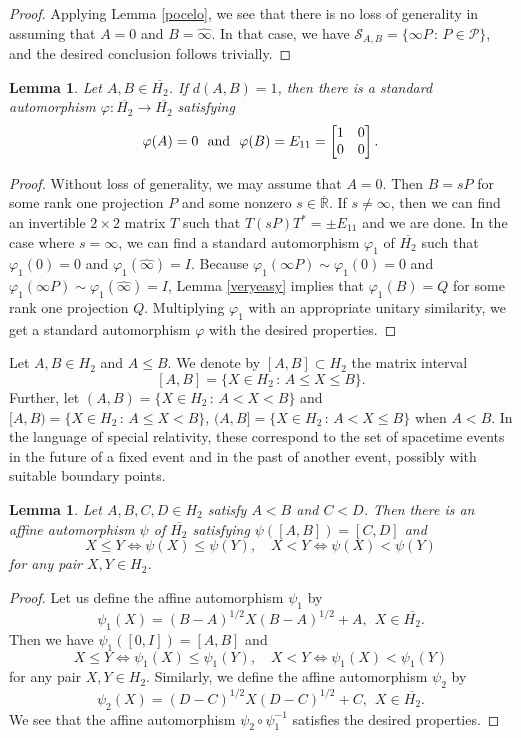 \documentclass[10pt]{amsart}
\newtheorem{lemma}[theorem]{Lemma}
\theoremstyle{definition}
\theoremstyle{remark}
\numberwithin{subsection}{section}
\numberwithin{equation}{section}
\newcommand\cP{{\mathcal{P}}}
\newcommand\oH{{\overline{H_2}}}
\newcommand\oi{{\widehat{\infty}}}
\newcommand\oR{{\overline{\mathbb{R}}}}
\begin{document}
\begin{proof}
Applying Lemma \ref{pocelo}, we see that there is no loss of generality in assuming that $A=0$ and $B=\oi$. In that case, we have ${\mathcal{S}}_{A,B}=\{\infty P\,:\, P\in \cP\}$, and the desired conclusion follows trivially.
\end{proof}


\begin{lemma}\label{pocelo1}
Let $A,B \in \oH$. If $d(A,B) = 1$, then there is a standard automorphism $\varphi \colon \oH \to \oH$ satisfying
\[
\varphi (A) = 0\ \  \text{and}\ \ \varphi (B) = E_{11}=\left[ \begin{matrix} 1 &0 \cr 0 & 0\cr \end{matrix} \right].
\]
\end{lemma}

\begin{proof}
Without loss of generality, we may assume that $A=0$. Then $B= sP$ for some rank one projection $P$ and some nonzero $s \in {\oR}$. If $s\not=\infty$, then we can find an invertible $2 \times 2$ matrix $T$ such that $T(sP)T^\ast = \pm E_{11}$ and we are done. In the case where $s= \infty$, we can find a standard automorphism $\varphi_1$ of $\oH$ such that $\varphi_1 (0) = 0$ and $\varphi_1 ({\oi}) = I$. Because $\varphi_1 (\infty P) \sim \varphi_1 (0)=0$ and  $\varphi_1 (\infty P) \sim \varphi_1  ({\oi}) = I$, Lemma \ref{veryeasy} implies that $\varphi_1 (B) = Q$ for some rank one projection $Q$. Multiplying $\varphi_1$ with an appropriate unitary similarity, we get a standard automorphism $\varphi$ with the desired properties.
\end{proof}


Let $A,B \in H_2$ and $A \leq B$. We denote by $[A,B] \subset H_2$  the matrix interval 
\[
[A,B] = \{ X \in H_2 \, : \, A \le X \le B \}.
\]
Further, let $(A,B) = \{ X \in H_2 \, : \, A < X < B \}$  and $[A,B) = \{ X \in H_2 \, : \, A \le  X < B \}$\index{$AB$3@$[A,B)$}, $(A,B] = \{ X \in H_2 \, : \, A <  X \leq B \}$ \index{$AB$4@$(A,B]$} when $A<B$. 
In the language of special relativity, these correspond to the set of spacetime events in the future of a fixed event and in the past of another event, possibly with suitable boundary points.


\begin{lemma}\label{Porder}
Let $A, B, C, D\in H_2$ satisfy $A<B$ and $C<D$.
Then there is an affine automorphism $\psi$ of $\oH$ satisfying $\psi([A, B])=[C, D]$ and 
\[
X\leq Y\iff \psi(X)\leq \psi(Y),\quad X< Y\iff \psi(X)< \psi(Y)
\]
for any pair $X, Y\in H_2$.
\end{lemma}
\begin{proof}
Let us define the affine automorphism $\psi_1$ by 
\[
\psi_1(X)=(B-A)^{1/2}X(B-A)^{1/2} + A,\ \ X\in \oH.
\]
Then we have 
$\psi_1([0, I])=[A, B]$ and 
\[
X\leq Y\iff \psi_1(X)\leq \psi_1(Y),\quad X< Y\iff \psi_1(X)< \psi_1(Y)
\]
for any pair $X, Y\in H_2$.
Similarly, we define the affine automorphism $\psi_2$ by 
\[
\psi_2(X)=(D-C)^{1/2}X(D-C)^{1/2} + C,\ \ X\in \oH. 
\]
We see that the affine automorphism $\psi_2\circ\psi_1^{-1}$ satisfies the desired properties.
\end{proof}
\end{document}
